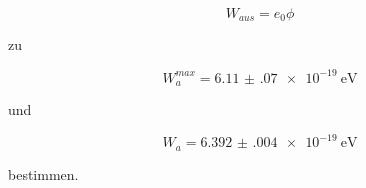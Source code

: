 \begin{equation}
    W_{aus}=e_0\phi
\end{equation}

zu

\begin{equation*}
    W_a^{max}=\SI{6.11(07)e-19}{\eV} 
\end{equation*}

und

\begin{equation*}
W_a=\SI{6.392(004)e-19}{\eV}
\end{equation*}

bestimmen.
%

